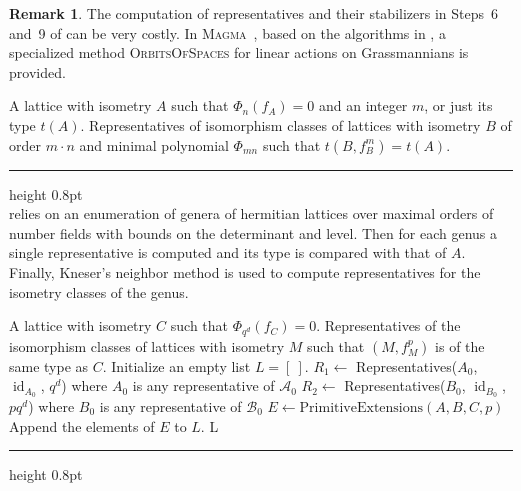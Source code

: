 \documentclass[a4paper]{amsart}
\makeatletter
\theoremstyle{definition}
\newtheorem{remark}[definition]{Remark}
\theoremstyle{plain}
\DeclareMathOperator{\id}{id}
\newcommand{\B}{\mathcal{B}}
\newcommand{\A}{\mathcal{A}}
\def\hrulefill{\leavevmode\leaders\hrule height 0.8pt\hfill\kern\z@}
\makeatother
\begin{document}
\begin{remark}
  The computation of representatives and their stabilizers in Steps~6 and~9 of  can be very costly.
  In \textsc{Magma}~\cite{magma}, based on the algorithms in \cite{obrien1990}, a specialized method \textsc{OrbitsOfSpaces}
for linear actions on Grassmannians is provided.
\end{remark}


\begingroup
{}\label{reps}
\endgroup
 \begin{algorithmic}
  \REQUIRE A lattice with isometry $A$ such that $\Phi_n(f_A)=0$ and an integer $m$,
  or just its type $t(A)$.
  \ENSURE Representatives of isomorphism classes of lattices with isometry $B$ of order $m \cdot n$ and minimal polynomial $\Phi_{mn}$ such that $t(B,f_B^m)=t(A)$.
 \end{algorithmic}\hrulefill\\

 relies on an enumeration of genera of hermitian lattices over maximal orders of number fields with bounds on the determinant and level.
Then for each genus a single representative is computed \cite[Algorithm 3.5.6]{KirschmerHabil}
and its type is compared with that of $A$.
Finally, Kneser's neighbor method \cite[\S 5]{KirschmerHabil} is used to compute representatives for the isometry classes of the genus.
\begingroup
{}\label{split}
\endgroup
\begin{algorithmic}[1]
\REQUIRE A lattice with isometry $C$ such that $\Phi_{q^d}(f_C)=0$.
\ENSURE Representatives of the isomorphism classes of lattices with isometry $M$ such that $(M,f_M^p)$ is of the same type as $C$.
\STATE Initialize an empty list $L = [\ ]$.
\FOR{ $(\A_0,\B_0) \in $ AdmissibleTriples$(p,C)$} \label{splitfor1}
  \STATE $R_1\gets$ Representatives($A_0$, $\id_{A_0}$, $q^d$) where $A_0$ is any representative of $\A_0$
  \STATE $R_2\gets$ Representatives($B_0$, $\id_{B_0}$, $pq^d$) where $B_0$ is any representative of $\B_0$
   \label{split_for} \label{splitfor2}
    \STATE $E \gets \mbox{PrimitiveExtensions}(A,B,C,p)$
    \STATE Append the elements of $E$ to $L$.
    \ENDFOR
\ENDFOR
\RETURN L
\end{algorithmic}\hrulefill\\
\end{document}

